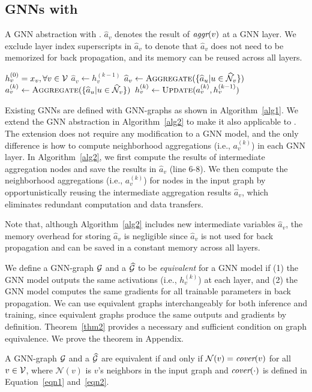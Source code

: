 \subsection{GNNs with \xgs}
\begin{algorithm}[t]
\caption{A GNN abstraction with \xgs. $\widehat{a}_v$ denotes the result of $\mbox{\rm\em aggr}(v)$ at a GNN layer. We exclude layer index superscripts in $\widehat{a}_v$ to denote that $\widehat{a}_v$ does not need to be memorized for back propagation,
and its memory can be reused across all layers.}
\label{alg2}
\begin{algorithmic}[1]
\State $h^{(0)}_v = x_v, \forall v \in \mathcal{V}$
\State $\widehat{a}_v \leftarrow h^{(k-1)}_v$
\EndFor
{}
\State $\widehat{a}_v \leftarrow \Call{Aggregate}{\{\widehat{a}_u | u \in \mw{N}_v\}}$
\EndFor
{}
\State $a^{(k)}_v \leftarrow \Call{Aggregate}{\{\widehat{a}_u | u \in \mw{N}_v\}}$
\State $h^{(k)}_v \leftarrow \Call{Update}{a^{(k)}_v, h^{(k-1)}_v}$
\EndFor
\EndFor
\end{algorithmic}
\end{algorithm}

Existing GNNs are defined with GNN-graphs as shown in Algorithm~\ref{alg1}.
We extend the GNN abstraction in Algorithm~\ref{alg2} to make it also applicable to \xgs.
The extension does not require any modification to a GNN model, and the only difference is how to compute neighborhood aggregations (i.e., $a^{(k)}_v$) in each GNN layer.
In Algorithm~\ref{alg2}, we first compute the results of intermediate aggregation nodes and save the results in $\widehat{a}_v$ (line 6-8).
We then compute the neighborhood aggregations (i.e., $a^{(k)}_v$) for nodes in the input graph by opportunistically reusing the intermediate aggregation results $\widehat{a}_v$, which eliminates redundant computation and data transfers.

Note that, although Algorithm~\ref{alg2} includes new intermediate variables $\widehat{a}_v$, the memory overhead for storing $\widehat{a}_v$ is negligible since $\widehat{a}_v$ is not used for back propagation and can be saved in a constant memory across all layers.

We define a GNN-graph $\mathcal{G}$ and a \xg $\mathcal{\widehat{G}}$ to be {\em equivalent} for a GNN model if (1) the GNN model outputs the same activations (i.e., $h^{(k)}_v$) at each layer, and (2) the GNN model computes the same gradients for all trainable parameters in back propagation. 
We can use equivalent graphs interchangeably for both inference and training, since equivalent graphs produce the same outputs and gradients by definition.
Theorem~\ref{thm2} provides a necessary and sufficient condition on graph equivalence. We prove the theorem in Appendix.
\begin{theorem}
\label{thm2}
A GNN-graph $\mathcal{G}$ and a \xg $\mathcal{\widehat{G}}$ are equivalent if and only if $\mathcal{N}(v) = \mbox{\rm\em cover}(v)$ for all $v \in \mathcal{V}$, where $\mathcal{N}(v)$ is $v$'s neighbors in the input graph and $\mbox{\rm\em cover}(\cdot)$ is defined in Equation~\ref{eqn1} and~\ref{eqn2}.
\end{theorem}

